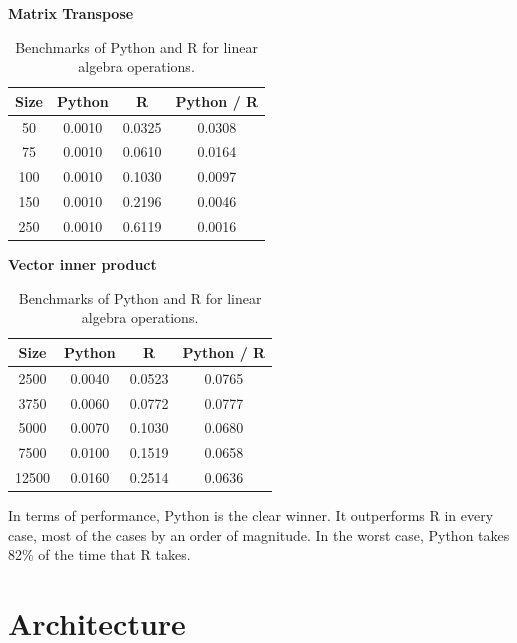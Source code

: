 \documentclass[%
  final,
  notitlepage,
  narroweqnarray,
  inline,
]{ieee}
\begin{document}
\begin{table}[h!]
\begin{center}
    \vspace{1em}
    \textbf{Matrix Transpose} \\
    \begin{tabular}{cccc}
      Size  & Python  &  R       & Python / R \\
      \hline
      50  & 0.0010  & 0.0325 & 0.0308 \\
      75  & 0.0010  & 0.0610 & 0.0164 \\
      100 & 0.0010  & 0.1030 & 0.0097 \\
      150 & 0.0010  & 0.2196 & 0.0046 \\
      250 & 0.0010  & 0.6119 & 0.0016 \\
    \end{tabular}

    \vspace{1em}
    \textbf{Vector inner product} \\
    \begin{tabular}{cccc}
      Size  & Python &  R       & Python / R \\
      \hline
      2500  & 0.0040 & 0.0523 & 0.0765 \\
      3750  & 0.0060 & 0.0772 & 0.0777 \\
      5000  & 0.0070 & 0.1030 & 0.0680 \\
      7500  & 0.0100 & 0.1519 & 0.0658 \\
      12500 & 0.0160 & 0.2514 & 0.0636 \\
    \end{tabular}
  \end{center}
  \caption{Benchmarks of Python and R for linear algebra
    operations.}
  \label{PythonvsR}
\end{table}

In terms of performance, Python is the clear winner. It outperforms R in every
case, most of the cases by an order of magnitude. In the worst case, Python
takes 82\% of the time that R takes.


\section{Architecture}
\end{document}
